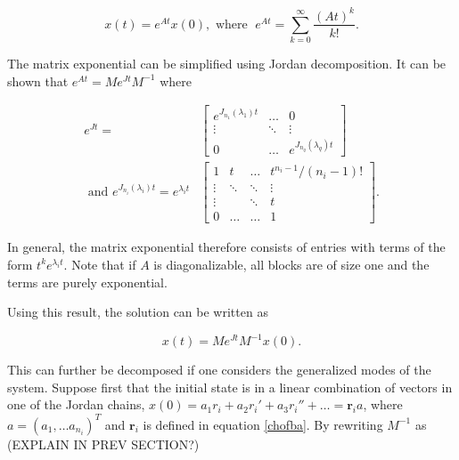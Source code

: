 \documentclass[../main.tex]{subfiles}
\begin{document}
\begin{equation}
    x(t) = e^{At}x(0), \text{ where } \;e^{At} = \sum_{k=0}^{\infty}\frac{(At)^k}{k!}.
\end{equation}

The matrix exponential can be simplified using Jordan decomposition. It can be shown that  $e^{At} = Me^{Jt}M^{-1}$ where 

\begin{equation}
    \begin{aligned}
        e^{Jt} = &\begin{bmatrix}e^{J_{n_1}(\lambda_1)t} & \dots & 0 \\
                                                         \vdots & \ddots & \vdots \\
                                                         0 & \dots &  e^{J_{n_q}(\lambda_q)t}\end{bmatrix} \\
            \text{ and } e^{J_{n_i}(\lambda_i)t} = e^{\lambda_it} &\begin{bmatrix} 1 & t & \dots & t^{n_i-1}/(n_i-1)! \\
                                                                \vdots  & \ddots & \ddots & \vdots \\
                                                                \vdots & & \ddots& t \\
                                                            0 & \dots & \dots & 1\ \end{bmatrix}.
    \end{aligned}
\end{equation}

In general, the matrix exponential therefore consists of entries with terms of the form $t^ke^{\lambda_it}$. Note that if $A$ is diagonalizable, all blocks are of size one and the terms are purely exponential. 

Using this result, the solution can be written as 

\begin{equation}\label{jordanode}
    x(t) = Me^{Jt}M^{-1}x(0).
\end{equation}

This can further be decomposed if one considers the generalized modes of the system. Suppose first that the initial state is in a linear combination of vectors in one of the Jordan chains, $x(0) = a_1r_i + a_2r_i' + a_3r_i'' + \dots = \boldsymbol{r}_ia$, where $a = (a_1, \dots a_{n_i})^T$ and $\boldsymbol{r}_i$ is defined in equation \ref{chofba}. By rewriting $M^{-1}$ as (EXPLAIN IN PREV SECTION?)
\end{document}
